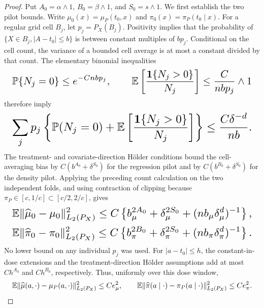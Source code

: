\documentclass{article}
\begin{document}
\begin{proof}
Put \(A_0=\alpha\wedge1\), \(B_0=\beta\wedge1\), and \(S_0=s\wedge1\). We first establish the two pilot bounds. Write \(\mu_0(x)=\mu_P(t_0,x)\) and \(\pi_0(x)=\pi_P(t_0\mid x)\). For a regular grid cell \(B_j\), let \(p_j=P_X(B_j)\). Positivity implies that the probability of \(\{X\in B_j,\lvert A-t_0\rvert\le b\}\) is between constant multiples of \(bp_j\). Conditional on the cell count, the variance of a bounded cell average is at most a constant divided by that count. The elementary binomial inequalities
\[
\makebox[\linewidth][c]{\resizebox{0.98\linewidth}{!}{\(\displaystyle \mathbb P\{N_j=0\}\le e^{-Cnbp_j},
\qquad
\mathbb E\left[\frac{\mathbf 1\{N_j>0\}}{N_j}\right]
\le \frac{C}{nbp_j}\wedge1\)}}
\]
therefore imply
\[
\makebox[\linewidth][c]{\resizebox{0.98\linewidth}{!}{\(\displaystyle \sum_jp_j\left\{\mathbb P(N_j=0)+\mathbb E\left[\frac{\mathbf 1\{N_j>0\}}{N_j}\right]\right\}
\le \frac{C\delta^{-d}}{nb}.\)}}
\]
The treatment- and covariate-direction H\"older conditions bound the cell-averaging bias by \(C(b^{A_0}+\delta^{S_0})\) for the regression pilot and by \(C(b^{B_0}+\delta^{S_0})\) for the density pilot. Applying the preceding count calculation on the two independent folds, and using contraction of clipping because \(\pi_P\in[c,1/c]\subset[c/2,2/c]\), gives
\[
\makebox[\linewidth][c]{\resizebox{0.98\linewidth}{!}{\(\displaystyle \mathbb E\lVert\widehat\mu_0-\mu_0\rVert_{L_2(P_X)}^2
\le C\left\{b_\mu^{2A_0}+\delta_\mu^{2S_0}+(nb_\mu\delta_\mu^d)^{-1}\right\},\)}}
\]
\[
\makebox[\linewidth][c]{\resizebox{0.98\linewidth}{!}{\(\displaystyle \mathbb E\lVert\widehat\pi_0-\pi_0\rVert_{L_2(P_X)}^2
\le C\left\{b_\pi^{2B_0}+\delta_\pi^{2S_0}+(nb_\pi\delta_\pi^d)^{-1}\right\}.\)}}
\]
No lower bound on any individual \(p_j\) was used. For \(\lvert a-t_0\rvert\le h\), the constant-in-dose extensions and the treatment-direction H\"older assumptions add at most \(Ch^{A_0}\) and \(Ch^{B_0}\), respectively. Thus, uniformly over this dose window,
\[
\makebox[\linewidth][c]{\resizebox{0.98\linewidth}{!}{\(\displaystyle \mathbb E\lVert\widehat\mu(a,\cdot)-\mu_P(a,\cdot)\rVert_{L_2(P_X)}^2\le Ce_\mu^2,
\qquad
\mathbb E\lVert\widehat\pi(a\mid\cdot)-\pi_P(a\mid\cdot)\rVert_{L_2(P_X)}^2\le Ce_\pi^2.\)}}
\]


\end{proof}
\end{document}
